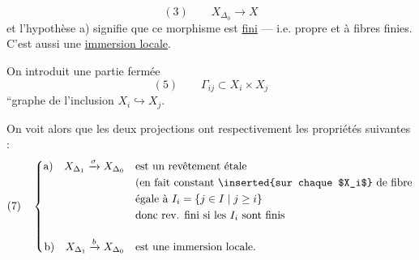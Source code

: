 \[
(3)\qquad X_{\Delta_0}\longrightarrow X
\]
et l'hypothèse a) signifie que ce
morphisme  est \uline{fini} --- i.e. propre
 et à fibres finies. C'est aussi une
\uline{immersion locale}.

On introduit une partie fermée
\[
(5)\qquad \Gamma_{ij}\subset X_i\times X_j
\]
``graphe de l'inclusion $X_i\hookrightarrow X_j$.

On voit alors que les deux projections
ont respectivement les propriétés suivantes :
\[
(7)\quad\left\{\begin{aligned}
\text{a)}\quad X_{\Delta_1}\xrightarrow{\sigma}X_{\Delta_0}&\quad\text{est un revêtement étale}\\
&\quad\text{(en fait constant \inserted{sur chaque $X_i$} de fibre}\\
&\quad\text{égale à }I_i=\{j\in I\mid j\geq i\}\\
&\quad\text{donc rev. fini si les }I_i\text{ sont finis}\\[1em]
\text{b)}\quad X_{\Delta_1}\xrightarrow{b}X_{\Delta_0}&\quad\text{est une immersion locale.}
\end{aligned}\right.
\]
